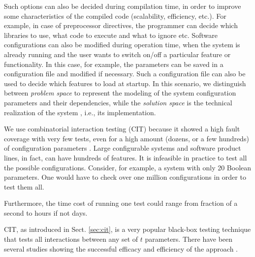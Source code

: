 \begin{tikzborder}{\cite{Gargantini16:validation}}
Such options can also be decided during compilation time, in order to improve some characteristics of the compiled code (scalability, efficiency, etc.). For example, in case of preprocessor directives, the programmer can decide which libraries to use, what code to execute and what to ignore etc. Software configurations can also be modified during operation time, when the system is already running and the user wants to switch on/off a particular feature or functionality. In this case, for example, the parameters can be saved in a configuration file and modified if necessary. Such a configuration file can also be used to decide which features to load at startup.
In this scenario, we distinguish between \emph{problem space} to represent the modeling of the system configuration parameters and
their dependencies, while the \emph{solution space} is the technical realization of the system \cite{NadiBKC14}, i.e., its implementation.

We use combinatorial interaction testing (CIT) because it showed a high fault coverage with very few tests, even for a high amount (dozens, or a few hundreds) of configuration parameters \cite{kuhn2013introductionbook}.
Large configurable systems and software product lines, in fact, can have hundreds of features. It is infeasible in practice to test all the possible configurations.  Consider, for example, a system with only 20 Boolean parameters. One would have to check over one million configurations in order to test them all. 

\noindent Furthermore, the time cost of running one test could range from fraction of a second to hours if not days. %

CIT, as introduced in Sect. \ref{sec:cit}, is a very popular black-box testing technique that tests all interactions between any set of $t$ parameters.  There have been several studies showing the successful efficacy and efficiency of the approach \cite{KuhnTSE04,Kuhn06:pseudo,Petke15:practical,Petke2013a}.  



\end{tikzborder}
